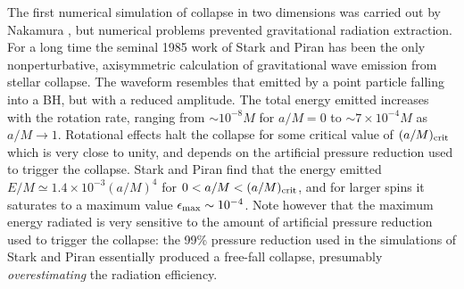 \documentclass[]{iopart}
\begin{document}
The first numerical simulation of collapse in two dimensions was carried out
by Nakamura \cite{Nakamura:1981}, but numerical problems prevented
gravitational radiation extraction. For a long time the seminal 1985 work of
Stark and Piran \cite{Stark:1985da} has been the only nonperturbative,
axisymmetric calculation of gravitational wave emission from stellar
collapse. The waveform resembles that emitted by a point particle falling into
a BH, but with a reduced amplitude.  The total energy emitted increases with
the rotation rate, ranging from $\sim 10^{-8} M$ for $a/M=0$ to $\sim 7\times
10^{-4} M$ as $a/M\to 1$. Rotational effects halt the collapse for some
critical value of $(a/M)_{\rm crit}$ which is very close to unity, and depends
on the artificial pressure reduction used to trigger the collapse. Stark and
Piran find that the energy emitted $E/M\simeq 1.4\times 10^{-3}(a/M)^4$ for
$0<a/M<(a/M)_{\rm crit}$, and for larger spins it saturates to a maximum value
$\epsilon_{\rm max}\sim 10^{-4}$. Note however that the maximum energy
radiated is very sensitive to the amount of artificial pressure reduction used
to trigger the collapse: the 99\% pressure reduction used in the simulations
of Stark and Piran essentially produced a free-fall collapse, presumably {\it
  overestimating} the radiation efficiency.
\end{document}
